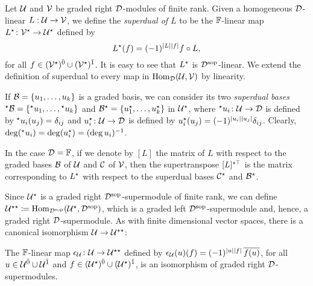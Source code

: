 \begin{defi}\label{defi:superdual-map}
    Let $\mathcal U$ and $\mathcal V$ be graded right $\mathcal{D}$-modules of finite rank. 
    Given a homogeneous $\mathcal{D}$-linear
    $L:\mathcal U \rightarrow \mathcal V$, we define the \emph{superdual of $L$} to be the $\mathbb{F}$-linear map $L^\star\colon \mathcal V^\star \rightarrow \mathcal U^\star$ defined by
    \[
        L^\star (f) = (-1)^{|L||f|} f \circ L,
    \] 
    for all $f\in (\mathcal V^\star)^{\bar0} \cup (\mathcal V^\star)^{\bar1}$. 
    It is easy to see that $L^\star$ is $\mathcal{D}^{\mathrm{sop}}$-linear. 
    We extend the definition of superdual to every map in $\operatorname{Hom}_{\mathcal{D}} (\mathcal U, \mathcal V)$ by linearity.
\end{defi}

\begin{defi}\label{defi:two-dual-bases}
    If $\mathcal B = \{u_1, \ldots, u_k\}$ is a graded basis, we can consider its two \emph{superdual bases} ${}^\star \mathcal B = \{{}^\star u_1, \ldots, {}^\star u_k\}$ and $\mathcal B^\star = \{u_1^\star, \ldots, u_k^\star\}$ in $\mathcal U^\star$, where ${}^\star u_i \colon \mathcal U \rightarrow \mathcal{D}$ is defined by ${}^\star u_i(u_j) = \delta_{ij}$ and $u_i^\star \colon \mathcal U \rightarrow \mathcal{D}$ is defined by $u_i^\star (u_j) = (-1)^{|u_i||u_j|} \delta_{ij}$. 
    Clearly, $\deg ({}^\star u_i) = \deg  (u_i^\star) = (\deg u_i)^{-1}$. 
\end{defi}

\begin{remark}
	In the case $\mathcal{D}=\mathbb{F}$, if we denote by $[L]$ the matrix of $L$ with respect to the graded bases $\mathcal B$ of $\mathcal U$ and $\mathcal C$ of $\mathcal V$, then the supertranspose $[L]^{s\top}$ is the matrix corresponding to $L^\star$ with respect to the superdual bases $\mathcal C^\star$ and $\mathcal B^\star$.
\end{remark}

Since $\mathcal U^\star$ is a graded right $\mathcal{D}^{\mathrm{sop}}$-supermodule of finite rank, we can define $\mathcal U^{\star\star} \coloneqq \operatorname{Hom}_{\mathcal{D}^{\mathrm{sop}}} (\mathcal U^\star, \mathcal{D}^{\mathrm{sop}})$, which is a graded left $\mathcal{D}^{\mathrm{sop}}$-supermodule and, hence, a graded right $\mathcal{D}$-supermodule. 
As with finite dimensional vector spaces, there is a canonical isomorphism $\mathcal U \to \mathcal U^{\star\star}$: 

\begin{lemma}\label{lemma:double-dual}
    The $\mathbb{F}$-linear map $\epsilon_\mathcal U\colon \mathcal U \to \mathcal U^{\star\star}$ defined by $\epsilon_\mathcal U(u)(f) = (-1)^{|u||f|}\, \overline{f(u)}$, for all $u \in \mathcal U^{\bar0} \cup \mathcal U^{\bar1}$ and $f \in (\mathcal U^\star)^{\bar0} \cup (\mathcal U^\star)^{\bar1}$, is an isomorphism of graded right $\mathcal{D}$-supermodules. 
\end{lemma}


